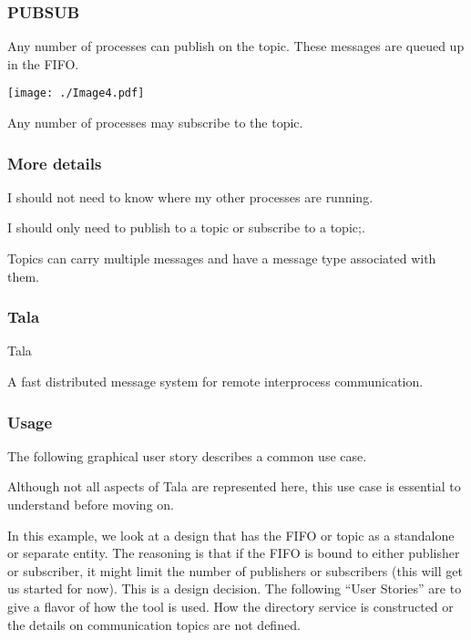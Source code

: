 \documentclass[xcolor=svgnames]{beamer}
\begin{document}

\begin{frame}[fragile]
\frametitle{PUBSUB}


  Any number of
processes can publish on the topic.   These messages are queued up in the  FIFO.
  
\vfill 
\begin{center}
\texttt{[image: ./Image4.pdf]}
\end{center}

\vfill

Any number of processes may subscribe to the topic.  
\end{frame}




\begin{frame}[fragile]
\frametitle{More details}

I should not need to know where my other processes are running. 
\vfill

I should only need to publish to a topic or subscribe
to a topic;.

\vfill

Topics can carry multiple messages and have a message type associated with them.
 
 
 
\end{frame}


\begin{frame}[fragile]
\frametitle{Tala}

\begin{huge}
Tala
\end{huge}
\vfill

A fast distributed message system for remote interprocess communication.
 
\end{frame}


\begin{frame}[fragile]
\frametitle{Usage}

The following graphical user story describes a common use case.
\vfill

Although not all aspects of Tala are represented here, this use case 
is essential to understand before moving on.
 
 \vfill
 
 In this example, we look at a design that has the FIFO or topic as a 
 standalone or separate entity.  The reasoning is that if the FIFO is 
 bound to either publisher or subscriber, it might limit the number of 
 publishers or subscribers (this will get us started for now).
 \vfill
 This is a design decision.  The following ``User Stories'' are to give
 a flavor of how the tool is used.  How the directory service is constructed
 or the details on communication topics are not defined.
 
\end{frame}
\end{document}
